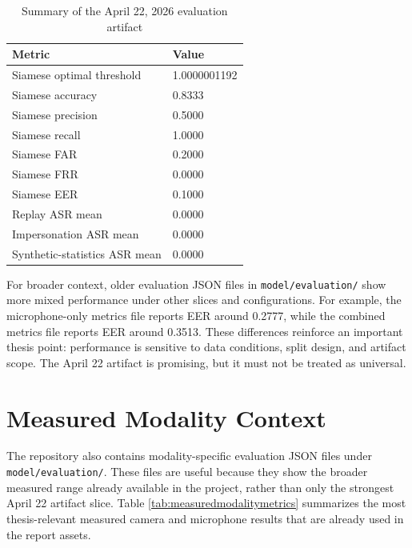 \documentclass[12pt]{report}
\begin{document}
\begin{table}[H]
\centering
\caption{Summary of the April 22, 2026 evaluation artifact}
\label{tab:artifactmetrics}
\renewcommand{\arraystretch}{1.3}
\begin{tabular}{p{}p{}}
\toprule
\textbf{Metric} & \textbf{Value} \\
\midrule
Siamese optimal threshold & 1.0000001192 \\
Siamese accuracy & 0.8333 \\
Siamese precision & 0.5000 \\
Siamese recall & 1.0000 \\
Siamese FAR & 0.2000 \\
Siamese FRR & 0.0000 \\
Siamese EER & 0.1000 \\
Replay ASR mean & 0.0000 \\
Impersonation ASR mean & 0.0000 \\
Synthetic-statistics ASR mean & 0.0000 \\
\bottomrule
\end{tabular}
\end{table}

For broader context, older evaluation JSON files in \texttt{model/evaluation/} show more mixed performance under other slices and configurations. For example, the microphone-only metrics file reports EER around 0.2777, while the combined metrics file reports EER around 0.3513. These differences reinforce an important thesis point: performance is sensitive to data conditions, split design, and artifact scope. The April 22 artifact is promising, but it must not be treated as universal.

\section{Measured Modality Context}

The repository also contains modality-specific evaluation JSON files under \texttt{model/evaluation/}. These files are useful because they show the broader measured range already available in the project, rather than only the strongest April 22 artifact slice. Table \ref{tab:measuredmodalitymetrics} summarizes the most thesis-relevant measured camera and microphone results that are already used in the report assets.
\end{document}
